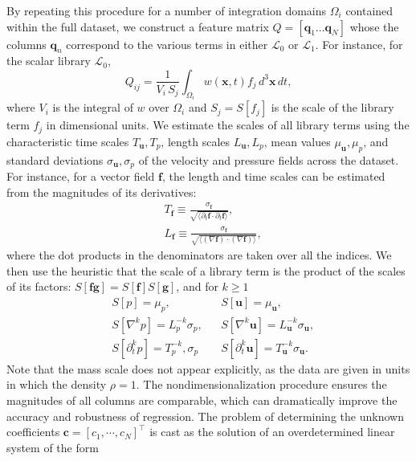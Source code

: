 \documentclass[preprint]{article}
\def\bi#1{\textbf{#1}}
\def\mx#1{#1}
\begin{document}
By repeating this procedure for a number of integration domains $\Omega_i$ contained within the full dataset, we construct a feature matrix $\mx{Q} = [{\bi q}_1 \dots {\bi q}_N]$  whose the columns ${\bi q}_n$ correspond to the various terms in either $\mathcal{L}_0$ or $\mathcal{L}_1$. For instance, for the scalar library $\mathcal{L}_0$,
\begin{equation}
    Q_{ij} = \frac{1}{V_i \, S_j}\int_{\Omega_i} w({\bi x},t) f_j\, d^3{\bi x}\, dt,
\end{equation}
where $V_i$ is the integral of $w$ over $\Omega_i$ and $S_j = S[f_j]$ is the 
scale of the library term $f_j$ in dimensional units. {We estimate the scales of all library terms using the characteristic time scales $T_{\bi u},T_p$, length scales $L_{\bi u}, L_p$, mean values $\mu_{\bi u}, \mu_p$, and standard deviations $\sigma_{\bi u}, \sigma_p$ of the velocity and pressure fields across the dataset. For instance, for a vector field ${\bi f}$, the length and time scales can be estimated from the magnitudes of its derivatives:
\begin{align}
    & T_{{\bi f}} \equiv \frac{\sigma_{\bi f}}{ \sqrt{ \langle \partial_t {\bi f} \cdot \partial_t {\bi f} \rangle} },\\
    & L_{{\bi f}} \equiv \frac{\sigma_{\bi f}}{ \sqrt{ \langle (\nabla {\bi f}) \cdot (\nabla {\bi f}) \rangle}},
\end{align}
where the dot products in the denominators are taken over all the indices. We then use the heuristic that the scale of a library term is the product of the scales of its factors: $S[{\bi f \bi g}] = S[{\bi f}] S[{\bi g}]$, and for $k \geq 1$
\begin{align}
    & S[p] = \mu_p, && S[{\bi u}] = \mu_{\bi u},\\
    & S[\nabla^k p] = L_p^{-k} \sigma_p, && S[{\nabla^k {\bi u}}] = L_{\bi u}^{-k} \sigma_{\bi u},\\
    & S[{\partial_t^k p}] = T_p^{-k}, \sigma_p && S[{\partial_t^k {\bi u}}] = T_{\bi u}^{-k} \sigma_{\bi u}.
\end{align}
Note that the mass scale does not appear explicitly, as the data are given in units in which the density $\rho=1$.} The nondimensionalization procedure ensures the magnitudes of all columns are comparable, which can dramatically improve the accuracy and robustness of regression. The problem of determining the unknown coefficients ${\bi c}=[c_1,\cdots,c_N]^\top$ is cast as the solution of an overdetermined linear system of the form
\end{document}
